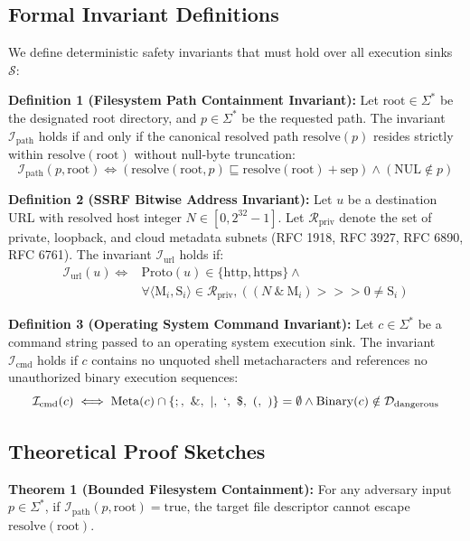 \documentclass[conference]{IEEEtran}
\begin{document}
\subsection{Formal Invariant Definitions}
We define deterministic safety invariants that must hold over all execution sinks $\mathcal{S}$:

\textbf{Definition 1 (Filesystem Path Containment Invariant):} Let $\text{root} \in \Sigma^*$ be the designated root directory, and $p \in \Sigma^*$ be the requested path. The invariant $\mathcal{I}_{\text{path}}$ holds if and only if the canonical resolved path $\text{resolve}(p)$ resides strictly within $\text{resolve}(\text{root})$ without null-byte truncation:
\begin{equation}
\mathcal{I}_{\text{path}}(p, \text{root}) \iff \left( \text{resolve}(\text{root}, p) \sqsubseteq \text{resolve}(\text{root}) + \text{sep} \right) \land (\text{NUL} \notin p)
\end{equation}

\textbf{Definition 2 (SSRF Bitwise Address Invariant):} Let $u$ be a destination URL with resolved host integer $N \in [0, 2^{32}-1]$. Let $\mathcal{R}_{\text{priv}}$ denote the set of private, loopback, and cloud metadata subnets (RFC 1918, RFC 3927, RFC 6890, RFC 6761). The invariant $\mathcal{I}_{\text{url}}$ holds if:
\begin{equation}
\begin{aligned}
\mathcal{I}_{\text{url}}(u) \iff &\text{Proto}(u) \in \{\text{http}, \text{https}\} \land \\
&\forall \langle \text{M}_i, \text{S}_i \rangle \in \mathcal{R}_{\text{priv}}, \left( (N \ \& \ \text{M}_i) \mathbin{>>>} 0 \neq \text{S}_i \right)
\end{aligned}
\end{equation}

\textbf{Definition 3 (Operating System Command Invariant):} Let $c \in \Sigma^*$ be a command string passed to an operating system execution sink. The invariant $\mathcal{I}_{\text{cmd}}$ holds if $c$ contains no unquoted shell metacharacters and references no unauthorized binary execution sequences:
\begin{equation}
\mathcal{I}_{\text{cmd}}(c) \iff \text{Meta}(c) \cap \{ ;, \ \&, \ |, \ `, \ \$, \ (, \ ) \} = \emptyset \land \text{Binary}(c) \notin \mathcal{D}_{\text{dangerous}}
\end{equation}

\subsection{Theoretical Proof Sketches}
\textbf{Theorem 1 (Bounded Filesystem Containment):} For any adversary input $p \in \Sigma^*$, if $\mathcal{I}_{\text{path}}(p, \text{root}) = \text{true}$, the target file descriptor cannot escape $\text{resolve}(\text{root})$.
\end{document}
